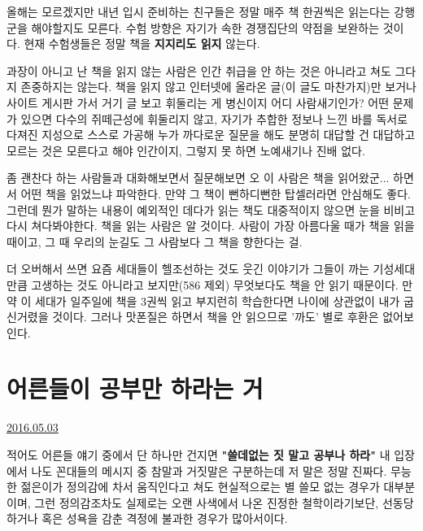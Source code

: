 올해는 모르겠지만 내년 입시 준비하는 친구들은 정말 매주 책 한권씩은 읽는다는 강행군을 해야할지도 모른다.
수험 방향은 자기가 속한 경쟁집단의 약점을 보완하는 것이다. 현재 수험생들은 정말 책을 \textbf{지지리도 읽지} 않는다.
\vspace{5mm}

과장이 아니고 난 책을 읽지 않는 사람은 인간 취급을 안 하는 것은 아니라고 쳐도 그다지 존중하지는 않는다.
책을 읽지 않고 인터넷에 올라온 글(이 글도 마찬가지)만 보거나 사이트 게시판 가서 거기 글 보고 휘둘리는 게 병신이지 어디 사람새기인가?
어떤 문제가 있으면 다수의 쥐떼근성에 휘둘리지 않고, 자기가 추합한 정보나 느낀 바를 독서로 다져진 지성으로 스스로 가공해
누가 까다로운 질문을 해도 분명히 대답할 건 대답하고 모르는 것은 모른다고 해야 인간이지, 그렇지 못 하면 노예새기나 진배 없다.
\vspace{5mm}

좀 괜찬다 하는 사람들과 대화해보면서 질문해보면 오 이 사람은 책을 읽어왔군... 하면서 어떤 책을 읽었느냐 파악한다.
만약 그 책이 뻔하디뻔한 탑셀러라면 안심해도 좋다.
그런데 뭔가 말하는 내용이 예외적인 데다가 읽는 책도 대중적이지 않으면 눈을 비비고 다시 쳐다봐야한다.
책을 읽는 사람은 알 것이다. 사람이 가장 아름다울 때가 책을 읽을 때이고, 그 때 우리의 눈길도 그 사람보다 그 책을 향한다는 걸.
\vspace{5mm}

더 오버해서 쓰면 요즘 세대들이 헬조선하는 것도 웃긴 이야기가 그들이 까는 기성세대만큼 고생하는 것도 아니라고 보지만(586 제외)
무엇보다도 책을 안 읽기 때문이다. 만약 이 세대가 일주일에 책을 3권씩 읽고 부지런히 학습한다면 나이에 상관없이 내가 굽신거렸을 것이다.
그러나 맛폰질은 하면서 책을 안 읽으므로 '까도' 별로 후환은 없어보인다.
\vspace{5mm}








\section{어른들이 공부만 하라는 거}
\href{https://www.kockoc.com/Apoc/758269}{2016.05.03}

\vspace{5mm}

적어도 어른들 얘기 중에서 단 하나만 건지면 \textbf{"쓸데없는 짓 말고 공부나 하라"}
내 입장에서 나도 꼰대들의 메시지 중 참말과 거짓말은 구분하는데 저 말은 정말 진짜다.
무능한 젊은이가 정의감에 차서 움직인다고 쳐도 현실적으로는 별 쓸모 없는 경우가 대부분이며,
그런 정의감조차도 실제로는 오랜 사색에서 나온 진정한 철학이라기보단, 선동당하거나 혹은 성욕을 감춘 격정에 불과한 경우가 많아서이다.
\vspace{5mm}

